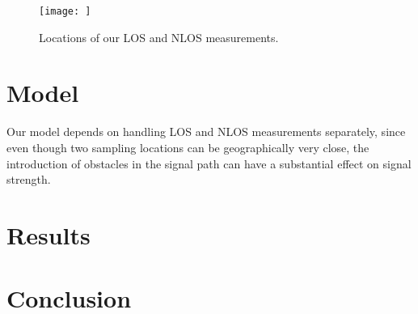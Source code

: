 \documentclass[12pt]{article}
\begin{document}
\begin{figure}[t]
\center
\texttt{[image: ]}
\caption{Locations of our LOS and NLOS measurements.}
\label{fig:locations}
\end{figure}


\section{Model}
Our model depends on handling LOS and NLOS measurements separately, since even
though two sampling locations can be geographically very close, the introduction
of obstacles in the signal path can have a substantial effect on signal
strength.

\section{Results}
\section{Conclusion}

%
%
\end{document}
